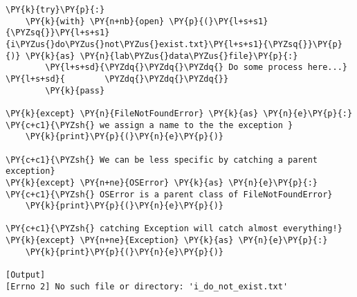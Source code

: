 \begin{Verbatim}[label=\makebox{\url{https://github.com/lucabaldini/cmepda/tree/master/slides/latex/snippets/try\_block.py}},commandchars=\\\{\}]
\PY{k}{try}\PY{p}{:}
    \PY{k}{with} \PY{n+nb}{open} \PY{p}{(}\PY{l+s+s1}{\PYZsq{}}\PY{l+s+s1}{i\PYZus{}do\PYZus{}not\PYZus{}exist.txt}\PY{l+s+s1}{\PYZsq{}}\PY{p}{)} \PY{k}{as} \PY{n}{lab\PYZus{}data\PYZus{}file}\PY{p}{:}
        \PY{l+s+sd}{\PYZdq{}\PYZdq{}\PYZdq{} Do some process here...}
\PY{l+s+sd}{        \PYZdq{}\PYZdq{}\PYZdq{}}
        \PY{k}{pass}
        
\PY{k}{except} \PY{n}{FileNotFoundError} \PY{k}{as} \PY{n}{e}\PY{p}{:} \PY{c+c1}{\PYZsh{} we assign a name to the the exception }
    \PY{k}{print}\PY{p}{(}\PY{n}{e}\PY{p}{)}

\PY{c+c1}{\PYZsh{} We can be less specific by catching a parent exception}
\PY{k}{except} \PY{n+ne}{OSError} \PY{k}{as} \PY{n}{e}\PY{p}{:} \PY{c+c1}{\PYZsh{} OSError is a parent class of FileNotFoundError}
    \PY{k}{print}\PY{p}{(}\PY{n}{e}\PY{p}{)}

\PY{c+c1}{\PYZsh{} catching Exception will catch almost everything!}
\PY{k}{except} \PY{n+ne}{Exception} \PY{k}{as} \PY{n}{e}\PY{p}{:}
    \PY{k}{print}\PY{p}{(}\PY{n}{e}\PY{p}{)}

[Output]
[Errno 2] No such file or directory: 'i_do_not_exist.txt'
\end{Verbatim}